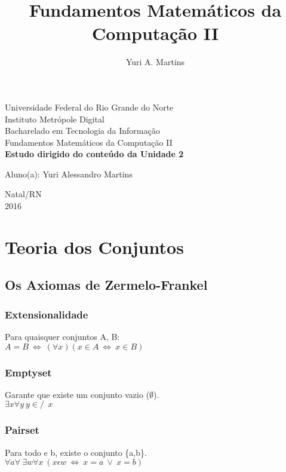 \documentclass[12pt, a4paper]{article}
\author{Yuri A. Martins}
\title{Fundamentos Matemáticos da Computação II}
\begin{document}
	\begin{titlepage}
		\begin{center}
			{\large Universidade Federal do Rio Grande do Norte}\\[0.2cm]
			{\large Instituto Metr\'opole Digital}\\[0.2cm]
			{\large Bacharelado em Tecnologia da Informa\c{c}\~ao}\\[0.2cm]
			{\large Fundamentos Matem\'aticos da Computa\c{c}\~ao II}\\[5.1cm]
			{\bf \huge Estudo dirigido do conte\'udo da Unidade 2}\\[5.1cm]
		\end{center}
		{\large Aluno(a): Yuri Alessandro Martins}\\[0.7cm]
		\begin{center}
			{\large Natal/RN}\\[0.2cm]
			{\large 2016}
		\end{center}
	\end{titlepage} 

	\tableofcontents
	\clearpage

	\section{Teoria dos Conjuntos}
		\subsection{Os Axiomas de Zermelo-Frankel}
			
			\subsubsection{Extensionalidade}
				Para quaisquer conjuntos A, B:\\
				$A = B ~ \Leftrightarrow ~ (\forall x ) (x \in A ~ \Leftrightarrow ~ x \in B) $
			
			\subsubsection{Emptyset}
				Garante que existe um conjunto vazio ($\emptyset$). \\
				$ \exists x \forall y ~ y \in\!\!\!\!\!/ ~~ x $
			
			\subsubsection{Pairset}
				Para todo  e b, existe o conjunto \{a,b\}.\\
				$ \forall a \forall ~ \exists w \forall x ~ (x \epsilon w ~ \Leftrightarrow ~ x = a ~\vee~ x = b ) $
\end{document}
